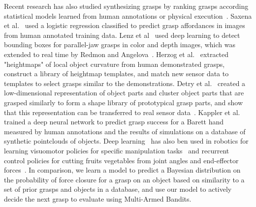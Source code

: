 Recent research has also studied synthesizing grasps by ranking grasps according statistical models learned from human annotations or physical execution~\cite{bohg2014data}.
Saxena et al.~\cite{jiang2011efficient, saxena2008robotic} used a logistic regression classified to predict grasp affordances in images from human annotated training data.
Lenz et al~\cite{lenz2015deep} used deep learning to detect bounding boxes for parallel-jaw grasps in color and depth images, which was extended to real time by Redmon and Angelova~\cite{redmon2014real}.
Herzog et al.~\cite{herzog2012template, herzog2014learning} extracted "heightmaps" of local object curvature from human demonstrated grasps, construct a library of heightmap templates, and match new sensor data to templates to select grasps similar to the demonstrations.
Detry et al.~\cite{detry2012generalizing} created a low-dimensional representation of object parts and cluster object parts that are grasped similarly to form a shape library of prototypical grasp parts, and show that this representation can be transferred to real sensor data~\cite{detry2013learning}.
Kappler et al.~\cite{kappler2015leveraging} trained a deep neural network to predict grasp success for a Barett hand measured by human annotations and the results of simulations on a database of synthetic pointclouds of objects.
Deep learning~\cite{krizhevsky2012imagenet} has also ben used in robotics for learning visuomotor policies for specific manipulation tasks~\cite{levine2015end} and recurrent control policies for cutting fruits vegetables from joint angles and end-effector forces~\cite{lenzdeepmpc}.
In comparison, we learn a model to predict a Bayesian distribution on the probability of force closure for a grasp on an object based on similarity to a set of prior grasps and objects in a database, and use our model to actively decide the next grasp to evaluate using Multi-Armed Bandits.


